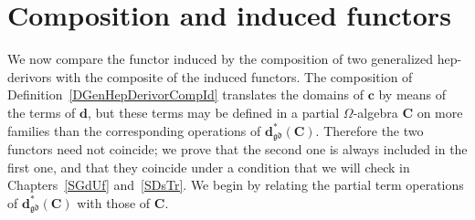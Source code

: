\documentclass[a4paper, reqno]{amsbook}
\newcommand{\gd}{\mathfrak{gd}}              %
\theoremstyle{plain}
\theoremstyle{definition}
\begin{document}
\section{Composition and induced functors}\label{SHepCompFunctors}

We now compare the functor induced by the composition of two generalized hep-derivors with the composite of the induced functors.
The composition of Definition~\ref{DGenHepDerivorCompId} translates the domains of $\mathbf{c}$ by means of the terms of $\mathbf{d}$, but these terms may be defined in a partial $\Omega$-algebra $\mathbf{C}$ on more families than the corresponding operations of $\mathbf{d}^{\ast}_{\gd}(\mathbf{C})$.
Therefore the two functors need not coincide; we prove that the second one is always included in the first one, and that they coincide under a condition that we will check in Chapters~\ref{SGdUf} and~\ref{SDsTr}.
We begin by relating the partial term operations of $\mathbf{d}^{\ast}_{\gd}(\mathbf{C})$ with those of $\mathbf{C}$.
\end{document}
